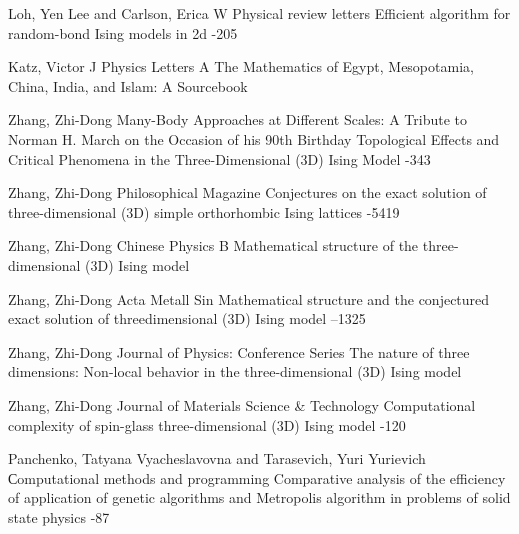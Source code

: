 \documentclass[10pt]{article}
\begin{document}
\begin{thebibliography}{20}
		\by Loh, Yen Lee and Carlson, Erica W
		\jour Physical review letters
		\paper Efficient algorithm for random-bond Ising models in 2d
		-205
		
		\by Katz, Victor J
		\jour Physics Letters A
		\paper The Mathematics of Egypt, Mesopotamia, China, India, and Islam: A Sourcebook
		
		\by Zhang, Zhi-Dong
		\jour Many-Body Approaches at Different Scales: A Tribute to Norman H. March on the Occasion of his 90th Birthday
		\paper Topological Effects and Critical Phenomena in the Three-Dimensional (3D) Ising Model
		-343
		
		\by Zhang, Zhi-Dong
		\jour Philosophical Magazine
		\paper Conjectures on the exact solution of three-dimensional (3D) simple orthorhombic Ising lattices
		-5419
		
		\by Zhang, Zhi-Dong
		\jour Chinese Physics B
		\paper Mathematical structure of the three-dimensional (3D) Ising model
		
		\by Zhang, Zhi-Dong
		\jour Acta Metall Sin
		\paper Mathematical structure and the conjectured exact solution of threedimensional (3D) Ising model
		--1325
		
		\by Zhang, Zhi-Dong
		\jour Journal of Physics: Conference Series
		\paper The nature of three dimensions: Non-local behavior in the three-dimensional (3D) Ising model
		
		\by Zhang, Zhi-Dong
		\jour Journal of Materials Science \& Technology
		\paper Computational complexity of spin-glass three-dimensional (3D) Ising model
		-120
		
		\by Panchenko, Tatyana Vyacheslavovna and Tarasevich, Yuri Yurievich
		\jour Сomputational methods and programming
		\paper Comparative analysis of the efficiency of application of genetic algorithms and Metropolis algorithm in problems of solid state physics
		-87
		
	\end{thebibliography}
	
	
	
	\EndArticle
\end{document}
